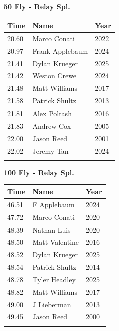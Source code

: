 \vspace{1.2em}
\noindent\begin{minipage}[t]{0.48\textwidth}
\centering
\textbf{\textcolor{teamprimary}{50 Fly - Relay Spl.}}\par
\vspace{0.5em}
\centering
\small
\renewcommand{\arraystretch}{1.0}
\setlength{\tabcolsep}{4pt}
\begin{tabular}{@{}p{1.8cm}p{3.0cm}p{1.0cm}@{}}
\toprule
\textbf{Time} & \textbf{Name} & \textbf{Year} \\
\midrule
20.60 & Marco Conati & 2022 \\
20.97 & Frank Applebaum & 2024 \\
21.41 & Dylan Krueger & 2025 \\
21.42 & Weston Crewe & 2024 \\
21.48 & Matt Williams & 2017 \\
21.58 & Patrick Shultz & 2013 \\
21.81 & Alex Poltash & 2016 \\
21.83 & Andrew Cox & 2005 \\
22.00 & Jason Reed & 2001 \\
22.02 & Jeremy Tan & 2024 \\
\bottomrule
\vspace{0.5em}
\end{tabular}
\end{minipage}
\hfill
\begin{minipage}[t]{0.48\textwidth}
\centering
\textbf{\textcolor{teamprimary}{100 Fly - Relay Spl.}}\par
\vspace{0.5em}
\centering
\small
\renewcommand{\arraystretch}{1.0}
\setlength{\tabcolsep}{4pt}
\begin{tabular}{@{}p{1.8cm}p{3.0cm}p{1.0cm}@{}}
\toprule
\textbf{Time} & \textbf{Name} & \textbf{Year} \\
\midrule
46.51 & F Applebaum & 2024 \\
47.72 & Marco Conati & 2020 \\
48.39 & Nathan Luis & 2020 \\
48.50 & Matt Valentine & 2016 \\
48.52 & Dylan Krueger & 2025 \\
48.54 & Patrick Shultz & 2014 \\
48.78 & Tyler Headley & 2025 \\
48.82 & Matt Williams & 2017 \\
49.00 & J Lieberman & 2013 \\
49.45 & Jason Reed & 2000 \\
\bottomrule
\vspace{0.5em}
\end{tabular}
\end{minipage}
